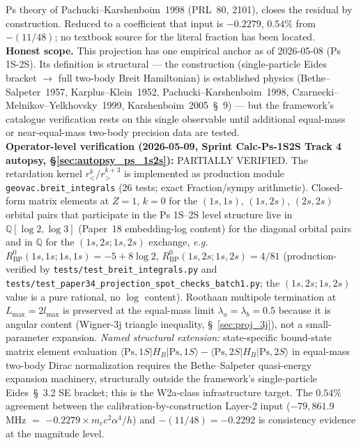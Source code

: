 \documentclass[11pt]{article}
\begin{document}
Ps theory of Pachucki--Karshenboim~1998 (PRL~80, 2101), closes the
residual by construction.  Reduced to a coefficient that input is
$-0.2279$, $0.54\%$ from $-(11/48)$; no textbook source for the literal
fraction has been located.\\
\textbf{Honest scope.}  This projection has one empirical anchor as
of 2026-05-08 (Ps 1S-2S).  Its definition is structural --- the
construction (single-particle Eides bracket $\to$ full two-body
Breit Hamiltonian) is established physics (Bethe--Salpeter~1957,
Karplus--Klein~1952, Pachucki--Karshenboim~1998, Czarnecki--Melnikov--Yelkhovsky~1999,
Karshenboim~2005~\S~9) --- but the framework's catalogue
verification rests on this single observable until additional
equal-mass or near-equal-mass two-body precision data are tested.\\
\textbf{Operator-level verification (2026-05-09, Sprint Calc-Ps-1S2S
Track 4 autopsy, \S\ref{sec:autopsy_ps_1s2s}):} PARTIALLY VERIFIED.
The retardation kernel $r_<^k/r_>^{k+3}$ is implemented as production
module \texttt{geovac.breit\_integrals} (26 tests; exact
Fraction/sympy arithmetic).  Closed-form matrix elements at $Z=1$,
$k=0$ for the $(1s,1s)$, $(1s,2s)$, $(2s,2s)$ orbital pairs that
participate in the Ps 1S--2S level structure live in
$\mathbb{Q}[\log 2, \log 3]$ (Paper~18 embedding-log content) for
the diagonal orbital pairs and in $\mathbb{Q}$ for the
$(1s,2s;1s,2s)$ exchange,
\emph{e.g.\,} $R^0_\text{BP}(1s,1s;1s,1s) = -5 + 8\log 2$,
$R^0_\text{BP}(1s,2s;1s,2s) = 4/81$
(production-verified by \texttt{tests/test\_breit\_integrals.py}
and \texttt{tests/test\_paper34\_projection\_spot\_checks\_batch1.py};
the $(1s,2s;1s,2s)$ value is a pure rational, no $\log$ content).
Roothaan multipole termination at $L_\text{max} = 2 l_\text{max}$ is
preserved at the equal-mass limit $\lambda_a = \lambda_b = 0.5$
because it is angular content (Wigner-3j triangle inequality,
\S~\ref{sec:proj_3j}), not a small-parameter expansion.
\emph{Named structural extension:} state-specific bound-state matrix
element evaluation $\langle\text{Ps}, 1S | H_B | \text{Ps}, 1S\rangle
- \langle\text{Ps}, 2S | H_B | \text{Ps}, 2S\rangle$ in equal-mass
two-body Dirac normalization requires the Bethe--Salpeter quasi-energy
expansion machinery, structurally outside the framework's
single-particle Eides~\S~3.2 SE bracket; this is the W2a-class
infrastructure target.  The $0.54\%$ agreement between the
calibration-by-construction Layer-2 input ($-79{,}861.9$ MHz $=$
$-0.2279 \times m_e c^2 \alpha^4/h$) and $-(11/48) = -0.2292$ is
consistency evidence at the magnitude level.\\
\end{document}
